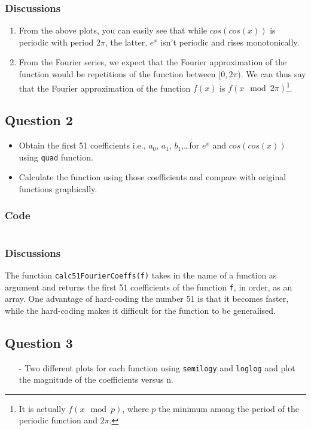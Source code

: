 \documentclass[11pt, a4paper, twoside]{article}
\begin{document}
            \subsubsection{Discussions}
                \begin{enumerate}
                    \item From the above plots, you can easily see that while $cos(cos(x))$ is periodic with period $2\pi$, the latter, $e^x$ isn't periodic and rises monotonically.
                    \item From the Fourier series, we expect that the Fourier approximation of the function would be repetitions of the function between $[0, 2\pi)$. We can thus say that the Fourier approximation of the function $f(x)$ is $f(x\mod2\pi)$\footnote{It is actually $f(x\mod p)$, where $p$ the minimum among the period of the periodic function and $2\pi$.}.
                \end{enumerate}
        \subsection{Question 2}
            \begin{itemize}[label=-]
                \item Obtain the first 51 coefficients i.e., $a_0$, $a_1$, $b_1$,\ldots for $e^x$ and $cos(cos(x))$ using \texttt{quad} function.
                \item Calculate the function using those coefficients and compare with original functions graphically.
            \end{itemize}
            \subsubsection{Code}
                \inputminted[linenos, breaklines]{python}{Code/q2.py}
            \subsubsection{Discussions}
                The function \texttt{calc51FourierCoeffs(f)} takes in the name of a function as argument and returns the first 51 coefficients of the function \texttt{f}, in order, as an array. One advantage of hard-coding the number 51 is that it becomes faster, while the hard-coding makes it difficult for the function to be generalised.

        \subsection{Question 3}
            \begin{itemize}
                \item[-] Two  different  plots  for  each  function  using  \texttt{semilogy}  and  \texttt{loglog} and plot the magnitude of the coefficients versus n.
            \end{itemize}
\end{document}
